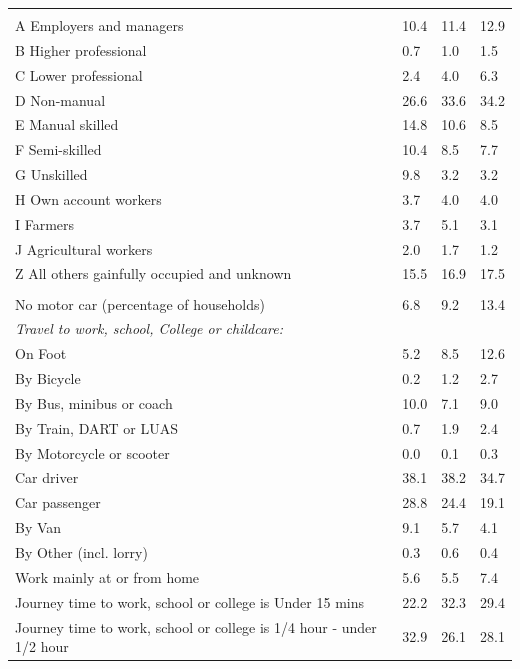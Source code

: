 \documentclass{article}
\begin{document}
\begin{table}[h]
\begin{tabular}{KTTT}
\hline
    \\ 
    \hline
A Employers and managers & 10.4& 11.4& 12.9\\
B Higher professional & 0.7& 1.0& 1.5\\
C Lower professional & 2.4& 4.0& 6.3\\
D Non-manual & 26.6& 33.6& 34.2\\
E Manual skilled & 14.8& 10.6&  8.5\\
F Semi-skilled & 10.4&  8.5&  7.7\\
G Unskilled & 9.8& 3.2& 3.2\\
H Own account workers & 3.7& 4.0& 4.0\\
I Farmers & 3.7& 5.1& 3.1\\
J Agricultural workers & 2.0& 1.7& 1.2\\
Z All others gainfully occupied and unknown & 15.5& 16.9& 17.5\\
\hline
{}\hline
    \\ 
    \hline
No motor car (percentage of households) &  6.8&  9.2& 
13.4\\
    \hline
\emph{Travel to work, school, College or childcare:} & & & \\
\quad On Foot &  5.2&  8.5& 12.6\\
\quad By Bicycle & 0.2& 1.2& 2.7\\
\quad By Bus, minibus or coach & 10.0&  7.1&  9.0\\
\quad By Train, DART or LUAS & 0.7& 1.9& 2.4\\
\quad By Motorcycle or scooter & 0.0& 0.1& 0.3\\
\quad Car driver & 38.1& 38.2& 34.7\\
\quad Car passenger & 28.8& 24.4& 19.1\\
\quad By Van & 9.1& 5.7& 4.1\\
\quad By Other (incl. lorry) & 0.3& 0.6& 0.4\\
    \hline
Work mainly at or from home & 5.6& 5.5& 7.4\\
Journey time to work, school or college is Under 15 mins & 22.2& 32.3& 29.4\\
Journey time to work, school or college is 1/4 hour - under 1/2 hour & 32.9& 26.1& 28.1\\

\end{tabular}
\end{table}
\end{document}
